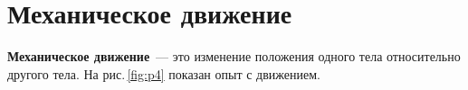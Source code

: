 \documentclass[main.tex]{subfiles}
\begin{document}


 

 

 
   

\section{Механическое движение}


\textbf{Механическое движение}~--- это изменение положения одного тела относительно другого тела. На рис.\,\ref{fig:p4} показан опыт с движением. 
\end{document}
